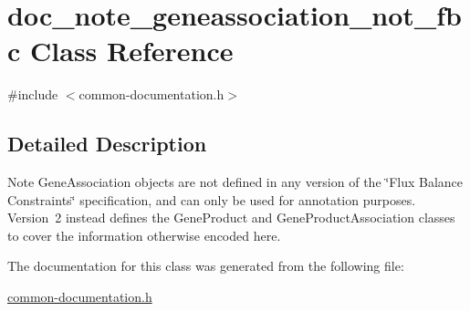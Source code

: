 \hypertarget{classdoc__note__geneassociation__not__fbc}{}\section{doc\+\_\+note\+\_\+geneassociation\+\_\+not\+\_\+fbc Class Reference}
\label{classdoc__note__geneassociation__not__fbc}


{\ttfamily \#include $<$common-\/documentation.\+h$>$}



\subsection{Detailed Description}
\begin{DoxyNote}{Note}
Gene\+Association objects are not defined in any version of the \char`\"{}\+Flux Balance Constraints\char`\"{} specification, and can only be used for annotation purposes. Version~2 instead defines the Gene\+Product and Gene\+Product\+Association classes to cover the information otherwise encoded here. 
\end{DoxyNote}


The documentation for this class was generated from the following file\+:\begin{DoxyCompactItemize}
\item 
\hyperlink{common-documentation_8h}{common-\/documentation.\+h}\end{DoxyCompactItemize}
